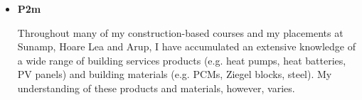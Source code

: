 \begin{itemize}
    \item \textbf{P2m}
    
    Throughout many of my construction-based courses and my placements at Sunamp, Hoare Lea and Arup,
    I have accumulated an extensive knowledge of a wide range of building services products (e.g. heat pumps, heat batteries, PV panels) and building materials (e.g. PCMs, Ziegel blocks, steel).
    My understanding of these products and materials, however, varies.
\end{itemize}

